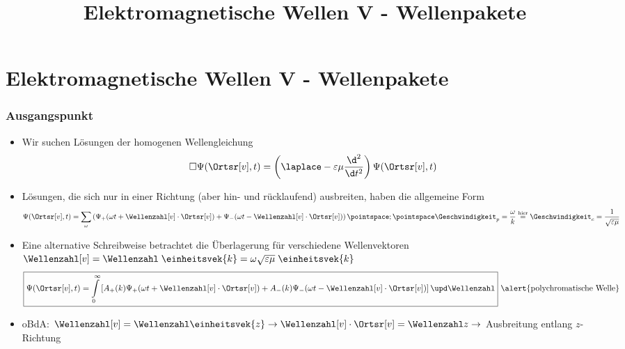 
  
\title[TET: Elektromagnetische Wellen V - Wellenpakete]{Elektromagnetische Wellen V - Wellenpakete}


% 
% 

\maketitle

% 
% 
\section{Elektromagnetische Wellen V - Wellenpakete}

\begin{frame}
  \frametitle{Ausgangspunkt}
  \begin{itemize}[<+->]
  \item Wir suchen Lösungen der homogenen Wellengleichung
    \begin{equation*}
      \square \Psi(\Ortsr[v], t) = \left(\laplace - \varepsilon\mu\frac{\d^2}{\d t^2}  \right) \Psi(\Ortsr[v], t)
    \end{equation*}
  \item Lösungen, die sich nur in einer Richtung (aber hin- und rücklaufend) ausbreiten, haben die allgemeine Form
    \begin{equation*}
      \Psi (\Ortsr[v], t) = \sum_\omega \left( \Psi_+ (\omega t + \Wellenzahl[v]\cdot\Ortsr[v]) + \Psi_- (\omega t - \Wellenzahl[v]\cdot\Ortsr[v]) \right) \pointspace ; \pointspace \Geschwindigkeit_p =\frac{\omega}{k} \stackrel{\text{hier}}{=} \Geschwindigkeit_c = \frac{1}{\sqrt{\varepsilon\mu}}  
    \end{equation*}
  \item Eine alternative Schreibweise betrachtet die Überlagerung für verschiedene Wellenvektoren \(\Wellenzahl[v] = \Wellenzahl\; \einheitsvek{k} = \omega\sqrt{\varepsilon\mu}\;\einheitsvek{k}\)
    \begin{equation*}
      \boxed{\Psi (\Ortsr[v], t) = \int\limits_{0}^\infty \left[ A_+(k) \Psi_+ (\omega t + \Wellenzahl[v]\cdot\Ortsr[v]) + A_-(k) \Psi_- (\omega t - \Wellenzahl[v]\cdot\Ortsr[v]) \right] \upd \Wellenzahl} \text{ \alert{polychromatische Welle}} 
    \end{equation*}
    \item oBdA: \(\Wellenzahl[v] = \Wellenzahl \einheitsvek{z}   \to \Wellenzahl[v]\cdot\Ortsr[v] = \Wellenzahl z \to\) Ausbreitung entlang \(z\)-Richtung
\end{itemize}
  \end{frame}

